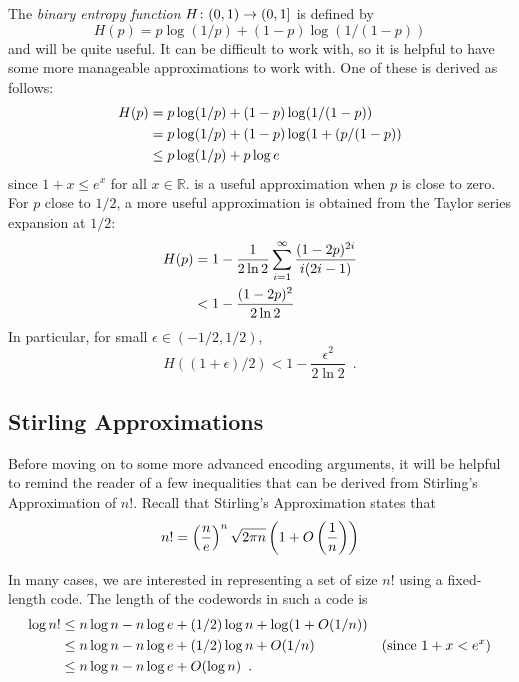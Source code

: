 \documentclass{patmorin}
\begin{document}
The \emph{binary entropy function} $H\colon (0,1)\to(0,1]$ is defined by
\[
    H(p) = p\log(1/p) + (1-p)\log(1/(1-p)) 
\]
and will be quite useful.  It can be difficult to work with, so it is helpful to have some more manageable approximations to work with.  One of these is derived as follows:
\begin{align}
  H(p) & = p\log(1/p) + (1-p)\log(1/(1-p)) \notag \\
       & = p\log(1/p) + (1-p)\log(1+(p/(1-p)) \notag \\
       & \le p\log(1/p) + p\log e \eqlabel{entropy-i} 
\end{align}
since $1+x\le e^x$ for all $x\in\mathbb{R}$.  is a
useful approximation when $p$ is close to zero. For $p$ close to $1/2$,
a more useful approximation is obtained from the Taylor series expansion at $1/2$:
\begin{align}
   H(p) & = 1-\frac{1}{2\ln 2}\sum_{i=1}^{\infty}\frac{(1-2p)^{2i}}{i(2i-1)} \\ 
        & < 1-\frac{(1-2p)^2}{2\ln 2} \eqlabel{entropy-ii}
\end{align}
In particular, for small $\epsilon\in (-1/2,1/2)$, 
\[
     H((1+\epsilon)/2) < 1-\frac{\epsilon^2}{2\ln 2} \enspace .
\]

\subsection{Stirling Approximations}

Before moving on to some more advanced encoding arguments, it will
be helpful to remind the reader of a few inequalities that can be
derived from Stirling's Approximation of $n!$.  Recall that Stirling's
Approximation states that
\begin{equation}
  n! = \left(\frac{n}{e}\right)^n\sqrt{2\pi n}\left(1+O\left(\frac{1}{n}\right)\right) 
   \eqlabel{stirling}
\end{equation}

In many cases, we are interested in representing a set of size $n!$
using a fixed-length code.  The length of the codewords in such a code
is 
\begin{align}
  \log n!
      & \le n\log n - n\log e + (1/2)\log n + \log(1+O(1/n)) \notag \\
      & \le n\log n - n\log e + (1/2)\log n + O(1/n)  
             & \text{(since $1+x < e^x$)}
               \eqlabel{stirling-tight} \\
      & \le n\log n - n\log e + O(\log n)  
             \eqlabel{stirling-loose} \enspace .
\end{align}
\end{document}
